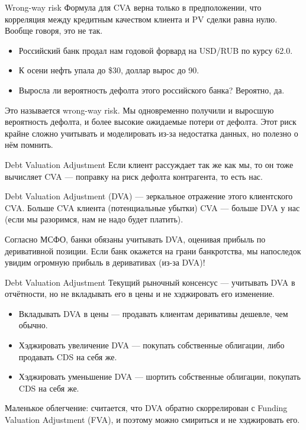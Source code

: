 \documentclass{beamer}
\begin{document}
\begin{frame}{Wrong-way risk}
\justify
Формула для CVA верна только в предположении, что корреляция между кредитным качеством клиента и PV сделки равна нулю. Вообще говоря, это не так.
\begin{itemize}
\justifying
\item Российский банк продал нам годовой форвард на USD/RUB по курсу 62.0.
\item К осени нефть упала до \$30, доллар вырос до 90.
\item Выросла ли вероятность дефолта этого российского банка? Вероятно, да.
\end{itemize}

Это называется wrong-way risk. Мы одновременно получили и выросшую вероятность дефолта, и более высокие ожидаемые потери от дефолта. Этот риск крайне сложно учитывать и моделировать из-за недостатка данных, но полезно о нём помнить.
\end{frame}



\begin{frame}{Debt Valuation Adjustment}
\justify
Если клиент рассуждает так же как мы, то он тоже вычисляет CVA --- поправку на риск дефолта контрагента, то есть нас.

\vspace{\baselineskip}
Debt Valuation Adjustment (DVA) --- зеркальное отражение этого клиентского CVA. Больше CVA клиента (потенциальные убытки) CVA --- больше DVA у нас (если мы разоримся, нам не надо будет платить).

\vspace{\baselineskip}
Согласно МСФО, банки обязаны учитывать DVA, оценивая прибыль по деривативной позиции. Если банк окажется на грани банкротства, мы напоследок увидим огромную прибыль в деривативах (из-за DVA)!
\end{frame}



\begin{frame}{Debt Valuation Adjustment}
\justify
Текущий рыночный консенсус --- учитывать DVA в отчётности, но не вкладывать его в цены и не хэджировать его изменение.

\begin{itemize}
\justifying
\item Вкладывать DVA в цены --- продавать клиентам деривативы дешевле, чем обычно.
\item Хэджировать увеличение DVA --- покупать собственные облигации, либо продавать CDS на себя же.
\item Хэджировать уменьшение DVA --- шортить собственные облигации, покупать CDS на себя же.
\end{itemize}

Маленькое облегчение: считается, что DVA обратно скоррелирован с Funding Valuation Adjustment (FVA), и поэтому можно смириться и не хэджировать его.
\end{frame}
\end{document}
